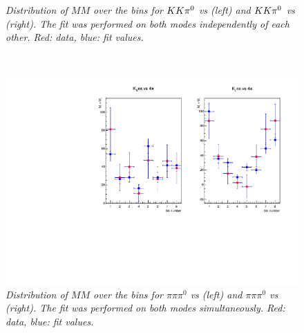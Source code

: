 \begin{figure}[!h]
	\vspace*{-0.5cm}
	\begin{center}
		\vspace*{-0.5cm}
	\end{center}
	\caption{\textit{Distribution of $MM$ over the bins for $K K \pi^0$ vs \KsPiPi (left) and $K K \pi^0$ vs \KlPiPi (right). The fit was performed on both modes independently of each other. Red: data, blue: fit values. }}
\end{figure}\\
\begin{figure}[!h]
	\vspace*{-0.5cm}
	\begin{center}
	 \includegraphics[width=0.96 \textwidth] {F_KKpi0_both.pdf}
		\vspace*{-0.5cm}
	\end{center}
	\caption{\textit{Distribution of $MM$ over the bins for $\pi \pi \pi^0$ vs \KsPiPi (left) and $\pi \pi \pi^0$ vs \KlPiPi (right). The fit was performed on both modes simultaneously. Red: data, blue: fit values. }}
\end{figure}\\
\clearpage
